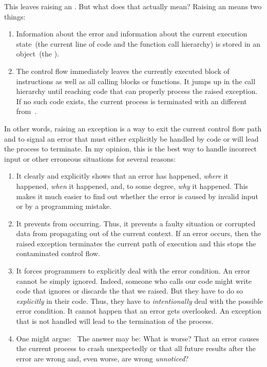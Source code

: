 This leaves raising an .
But what does that actually mean?
Raising an  means two things:%
%
\begin{enumerate}%
%
\item Information about the error and information about the current execution state~(the current line of code and the function call hierarchy) is stored in an object~(the ).%
%
\item The control flow immediately leaves the currently executed block of instructions as well as all calling blocks or functions.
It jumps up in the call hierarchy until reaching code that can properly process the raised exception.
If no such code exists, the current process is terminated with an  different from~.%
%
\end{enumerate}%
%
In other words, raising an exception is a way to exit the current control flow path and to signal an error that must either explicitly be handled by code or will lead the process to terminate.
In my opinion, this is the best way to handle incorrect input or other erroneous situations for several reasons:%
%
\begin{enumerate}%
%
\item It clearly and explicitly shows that an error has happened, \emph{where} it happened, \emph{when} it happened, and, to some degree, \emph{why} it happened.
This makes it much easier to find out whether the error is caused by invalid input or by a programming mistake.%
%
\item It prevents  from occurring.
Thus, it prevents a faulty situation or corrupted data from propagating out of the current context.
If an error occurs, then the raised exception terminates the current path of execution and this stops the contaminated control flow.%
%
\item It forces programmers to explicitly deal with the error condition.
An error cannot be simply ignored.
Indeed, someone who calls our code might write code that ignores or discards the  that we raised.
But they have to do so \emph{explicitly} in their code.
Thus, they have to \emph{intentionally} deal with the possible error condition.
It cannot happen that an error gets overlooked.
An exception that is not handled will lead to the termination of the process.%
%
\item One might argue:~\emph{}
The answer may be:
What is worse?
That an error causes the current process to crash unexpectedly or that all future results after the error are wrong and, even worse, are wrong \emph{unnoticed}?%
%
\end{enumerate}%
